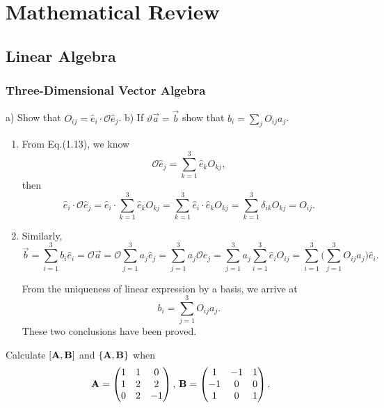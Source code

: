 \documentclass[a4paper]{book}
\newcommand{\A}{{\bf A}}
\newcommand{\B}{{\bf B}}
\begin{document}
	\chapter{Mathematical Review}
	
	\section{Linear Algebra}
	
	\subsection{Three-Dimensional Vector Algebra}
	
	\begin{exercise}
	a) Show that $O_{ij} = \hat e_i \cdot \mathscr{O} \hat{e}_j$. b) If $\vartheta \vec{a} = \vec{b}$ show that $b_i = \displaystyle \sum_j O_{ij} a_j$.
	\end{exercise}
	
	\begin{solution}
	\begin{enumerate}
	
	\item From Eq.(1.13), we know
	\[
		\mathscr{O} \hat{e}_j = \sum_{k=1}^3\hat{e}_k O_{kj},
	\]
	then
	\begin{equation}
		\hat{e}_i \cdot \mathscr{O} \hat{e}_j = \hat{e}_i \cdot \sum_{k=1}^3 \hat{e}_k O_{kj} = \sum_{k=1}^3 \hat{e}_i \cdot  \hat{e}_k O_{kj} = \sum_{k=1}^3 \delta_{ik} O_{kj} = O_{ij}.
	\end{equation}
	
	\item Similarly,
	\[
		\vec{b} = \sum_{i=1}^3 b_i\hat{e}_i = \mathscr{O} \vec{a} = \mathscr{O} \sum_{j=1}^3 a_j \hat{e}_j = \sum_{j=1}^3 a_j \mathscr{O} \hat{e}_j = \sum_{j=1}^3 a_j \sum_{i=1}^3 \hat{e}_i O_{ij} = \sum_{i=1}^3 \Big( \sum_{j=1}^3 O_{ij} a_j \Big) \hat{e}_i.
	\]
		
	From the uniqueness of linear expression by a basis, we arrive at
	\begin{equation}
		b_i = \sum_{j=1}^3 O_{ij} a_j.
	\end{equation}
	These two conclusions have been proved.
	
	\end{enumerate}
	\end{solution}
	
	\begin{exercise}
	Calculate $[\A,\B]$ and $\{\A,\B\}$ when
	\[
		\A = \begin{pmatrix}
					1 & 1 & 0 \\
					1 & 2 & 2 \\
					0 & 2 & -1
		\end{pmatrix}, \, \B = \begin{pmatrix}
					1 & -1 & 1 \\
					-1 & 0 & 0 \\
					1 & 0 & 1
		\end{pmatrix}.
	\]
	\end{exercise}
\end{document}
